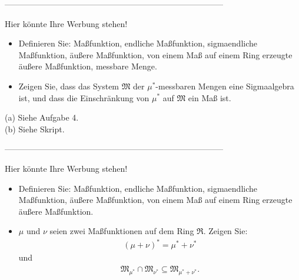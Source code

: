 --------------------------------------------------------------------------------

\begin{exercise}

Hier könnte Ihre Werbung stehen!

\begin{itemize}
  \item[(a)] Definieren Sie: Maßfunktion, endliche Maßfunktion, sigmaendliche Maßfunktion, äußere Maßfunktion, von einem Maß auf einem Ring erzeugte äußere Maßfunktion, messbare Menge.
  \item[(b)] Zeigen Sie, dass das System $\mathfrak{M}$ der $\mu^\ast$-messbaren Mengen eine Sigmaalgebra ist, und dass die Einschränkung von $\mu^\ast$ auf $\mathfrak{M}$ ein Maß ist.
\end{itemize}

\end{exercise}

\begin{solution}

(a) Siehe Aufgabe 4. \\

(b) Siehe Skript.

\end{solution}

--------------------------------------------------------------------------------

\begin{exercise}

Hier könnte Ihre Werbung stehen!

\begin{itemize}
  \item[(a)] Definieren Sie: Maßfunktion, endliche Maßfunktion, sigmaendliche Maßfunktion, äußere Maßfunktion, von einem Maß auf einem Ring erzeugte äußere Maßfunktion.
  \item[(b)] $\mu$ und $\nu$ seien zwei Maßfunktionen auf dem Ring $\mathfrak{R}$. Zeigen Sie:
  \begin{align*}
    (\mu + \nu)^\ast = \mu^\ast + \nu^\ast
  \end{align*}
  und
  \begin{align*}
    \mathfrak{M}_{\mu^\ast} \cap \mathfrak{M}_{\nu^\ast}
    \subseteq
    \mathfrak{M}_{\mu^\ast + \nu^\ast}.
  \end{align*}
\end{itemize}

\end{exercise}

